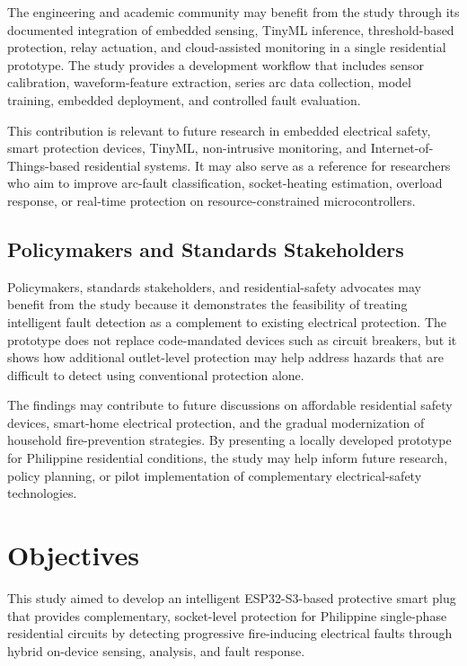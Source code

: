 The engineering and academic community may benefit from the study
through its documented integration of embedded sensing, TinyML
inference, threshold-based protection, relay actuation, and
cloud-assisted monitoring in a single residential prototype. The study
provides a development workflow that includes sensor calibration,
waveform-feature extraction, series arc data collection, model training,
embedded deployment, and controlled fault evaluation.

This contribution is relevant to future research in embedded electrical
safety, smart protection devices, TinyML, non-intrusive monitoring, and
Internet-of-Things-based residential systems. It may also serve as a
reference for researchers who aim to improve arc-fault classification,
socket-heating estimation, overload response, or real-time protection on
resource-constrained microcontrollers.

\subsection{Policymakers and Standards Stakeholders}\label{policymakers-and-standards-stakeholders}

Policymakers, standards stakeholders, and residential-safety advocates
may benefit from the study because it demonstrates the feasibility of
treating intelligent fault detection as a complement to existing
electrical protection. The prototype does not replace code-mandated
devices such as circuit breakers, but it shows how additional
outlet-level protection may help address hazards that are difficult to
detect using conventional protection alone.

The findings may contribute to future discussions on affordable
residential safety devices, smart-home electrical protection, and the
gradual modernization of household fire-prevention strategies. By
presenting a locally developed prototype for Philippine residential
conditions, the study may help inform future research, policy planning,
or pilot implementation of complementary electrical-safety technologies.

\section{Objectives}\label{objectives}

This study aimed to develop an intelligent ESP32-S3-based protective
smart plug that provides complementary, socket-level protection for
Philippine single-phase residential circuits by detecting progressive
fire-inducing electrical faults through hybrid on-device sensing,
analysis, and fault response.

